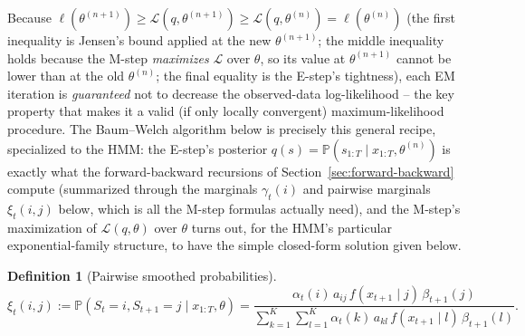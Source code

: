 \documentclass[11pt]{article}
\theoremstyle{definition}
\newtheorem{definition}[theorem]{Definition}
\theoremstyle{remark}
\begin{document}
Because $\ell(\theta^{(n+1)})\ge\mathcal L(q,\theta^{(n+1)})\ge\mathcal L(q,\theta^{(n)})=\ell(\theta^{(n)})$ (the first inequality is Jensen's bound applied at the new $\theta^{(n+1)}$; the middle inequality holds because the M-step \emph{maximizes} $\mathcal L$ over $\theta$, so its value at $\theta^{(n+1)}$ cannot be lower than at the old $\theta^{(n)}$; the final equality is the E-step's tightness), each EM iteration is \emph{guaranteed} not to decrease the observed-data log-likelihood -- the key property that makes it a valid (if only locally convergent) maximum-likelihood procedure. The Baum--Welch algorithm below is precisely this general recipe, specialized to the HMM: the E-step's posterior $q(s)=\mathbb{P}(s_{1:T}\mid x_{1:T},\theta^{(n)})$ is exactly what the forward-backward recursions of Section~\ref{sec:forward-backward} compute (summarized through the marginals $\gamma_t(i)$ and pairwise marginals $\xi_t(i,j)$ below, which is all the M-step formulas actually need), and the M-step's maximization of $\mathcal L(q,\theta)$ over $\theta$ turns out, for the HMM's particular exponential-family structure, to have the simple closed-form solution given below.

\begin{definition}[Pairwise smoothed probabilities]
\[
\xi_t(i,j) := \mathbb{P}(S_t=i,S_{t+1}=j\mid x_{1:T},\theta) = \frac{\alpha_t(i)\,a_{ij}\,f(x_{t+1}\mid j)\,\beta_{t+1}(j)}{\sum_{k=1}^K\sum_{l=1}^K\alpha_t(k)\,a_{kl}\,f(x_{t+1}\mid l)\,\beta_{t+1}(l)}.
\]
\end{definition}
\end{document}
